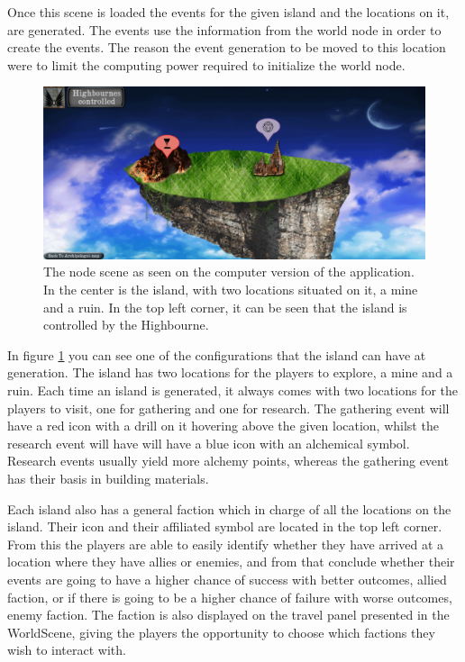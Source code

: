 Once this scene is loaded the events for the given island and the locations on it, are generated. The events use the information from the world node in order to create the events. The reason the event generation to be moved to this location were to limit the computing power required to initialize the world node. 

\begin{figure}[!ht]
    \centering
    \includegraphics[width=\textwidth]{Images/NodeScene.png}
    \caption{The node scene as seen on the computer version of the application. In the center is the island, with two locations situated on it, a mine and a ruin. In the top left corner, it can be seen that the island is controlled by the Highbourne.}
    \label{fig:nodescene}
\end{figure}

In figure \ref{fig:nodescene} you can see one of the configurations that the island can have at generation. The island has two locations for the players to explore, a mine and a ruin. 
Each time an island is generated, it always comes with two locations for the players to visit, one for gathering and one for research. The gathering event will have a red icon with a drill on it hovering above the given location, whilst the research event will have will have a blue icon with an alchemical symbol.
Research events usually yield more alchemy points, whereas the gathering event has their basis in building materials.

Each island also has a general faction which in charge of all the locations on the island. Their icon and their affiliated symbol are located in the top left corner. From this the players are able to easily identify whether they have arrived at a location where they have allies or enemies, and from that conclude whether their events are going to have a higher chance of success with better outcomes, allied faction, or if there is going to be a higher chance of failure with worse outcomes, enemy faction.
The faction is also displayed on the travel panel presented in the WorldScene, giving the players the opportunity to choose which factions they wish to interact with.


